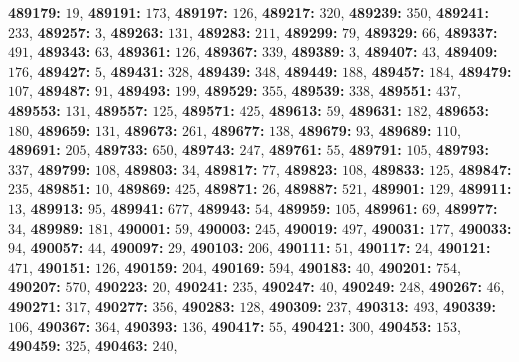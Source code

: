 \textsf{\bfseries 489179:} $19$, \textsf{\bfseries 489191:} $173$, \textsf{\bfseries 489197:} $126$, \textsf{\bfseries 489217:} $320$, \textsf{\bfseries 489239:} $350$, \textsf{\bfseries 489241:} $233$, \textsf{\bfseries 489257:} $3$, \textsf{\bfseries 489263:} $131$, \textsf{\bfseries 489283:} $211$, \textsf{\bfseries 489299:} $79$, \textsf{\bfseries 489329:} $66$, \textsf{\bfseries 489337:} $491$, \textsf{\bfseries 489343:} $63$, \textsf{\bfseries 489361:} $126$, \textsf{\bfseries 489367:} $339$, \textsf{\bfseries 489389:} $3$, \textsf{\bfseries 489407:} $43$, \textsf{\bfseries 489409:} $176$, \textsf{\bfseries 489427:} $5$, \textsf{\bfseries 489431:} $328$, \textsf{\bfseries 489439:} $348$, \textsf{\bfseries 489449:} $188$, \textsf{\bfseries 489457:} $184$, \textsf{\bfseries 489479:} $107$, \textsf{\bfseries 489487:} $91$, \textsf{\bfseries 489493:} $199$, \textsf{\bfseries 489529:} $355$, \textsf{\bfseries 489539:} $338$, \textsf{\bfseries 489551:} $437$, \textsf{\bfseries 489553:} $131$, \textsf{\bfseries 489557:} $125$, \textsf{\bfseries 489571:} $425$, \textsf{\bfseries 489613:} $59$, \textsf{\bfseries 489631:} $182$, \textsf{\bfseries 489653:} $180$, \textsf{\bfseries 489659:} $131$, \textsf{\bfseries 489673:} $261$, \textsf{\bfseries 489677:} $138$, \textsf{\bfseries 489679:} $93$, \textsf{\bfseries 489689:} $110$, \textsf{\bfseries 489691:} $205$, \textsf{\bfseries 489733:} $650$, \textsf{\bfseries 489743:} $247$, \textsf{\bfseries 489761:} $55$, \textsf{\bfseries 489791:} $105$, \textsf{\bfseries 489793:} $337$, \textsf{\bfseries 489799:} $108$, \textsf{\bfseries 489803:} $34$, \textsf{\bfseries 489817:} $77$, \textsf{\bfseries 489823:} $108$, \textsf{\bfseries 489833:} $125$, \textsf{\bfseries 489847:} $235$, \textsf{\bfseries 489851:} $10$, \textsf{\bfseries 489869:} $425$, \textsf{\bfseries 489871:} $26$, \textsf{\bfseries 489887:} $521$, \textsf{\bfseries 489901:} $129$, \textsf{\bfseries 489911:} $13$, \textsf{\bfseries 489913:} $95$, \textsf{\bfseries 489941:} $677$, \textsf{\bfseries 489943:} $54$, \textsf{\bfseries 489959:} $105$, \textsf{\bfseries 489961:} $69$, \textsf{\bfseries 489977:} $34$, \textsf{\bfseries 489989:} $181$, \textsf{\bfseries 490001:} $59$, \textsf{\bfseries 490003:} $245$, \textsf{\bfseries 490019:} $497$, \textsf{\bfseries 490031:} $177$, \textsf{\bfseries 490033:} $94$, \textsf{\bfseries 490057:} $44$, \textsf{\bfseries 490097:} $29$, \textsf{\bfseries 490103:} $206$, \textsf{\bfseries 490111:} $51$, \textsf{\bfseries 490117:} $24$, \textsf{\bfseries 490121:} $471$, \textsf{\bfseries 490151:} $126$, \textsf{\bfseries 490159:} $204$, \textsf{\bfseries 490169:} $594$, \textsf{\bfseries 490183:} $40$, \textsf{\bfseries 490201:} $754$, \textsf{\bfseries 490207:} $570$, \textsf{\bfseries 490223:} $20$, \textsf{\bfseries 490241:} $235$, \textsf{\bfseries 490247:} $40$, \textsf{\bfseries 490249:} $248$, \textsf{\bfseries 490267:} $46$, \textsf{\bfseries 490271:} $317$, \textsf{\bfseries 490277:} $356$, \textsf{\bfseries 490283:} $128$, \textsf{\bfseries 490309:} $237$, \textsf{\bfseries 490313:} $493$, \textsf{\bfseries 490339:} $106$, \textsf{\bfseries 490367:} $364$, \textsf{\bfseries 490393:} $136$, \textsf{\bfseries 490417:} $55$, \textsf{\bfseries 490421:} $300$, \textsf{\bfseries 490453:} $153$, \textsf{\bfseries 490459:} $325$, \textsf{\bfseries 490463:} $240$, 
